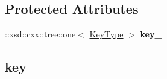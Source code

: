 \subsection*{Protected Attributes}
\begin{DoxyCompactItemize}
\item 
\hypertarget{classopenstack_1_1xml_1_1MetadataItem_a2d863c314d5f36bf18876775bbefae48}{
::xsd::cxx::tree::one$<$ \hyperlink{classopenstack_1_1xml_1_1MetadataKey}{KeyType} $>$ {\bfseries key\_\-}}
\label{classopenstack_1_1xml_1_1MetadataItem_a2d863c314d5f36bf18876775bbefae48}

\end{DoxyCompactItemize}
\subsection*{key}
\label{_amgrp3c6e0b8a9c15224a8228b9a98ca1531d}
